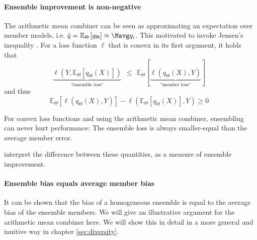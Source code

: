 \documentclass[
	twoside=false, %
]{kaobook}
\begin{document}
\paragraph{Ensemble improvement is non-negative} The arithmetic mean combiner can be seen as approximating an expectation over member models, i.e. $\bar{q} = \mathbb{E}_{\Theta} \left[q_{\Theta}\right] \approx \Mavg q_i$.
This motivated \cite{abe_PathologiesPredictiveDiversity_2023} to invoke Jensen's inequality
. For a loss function $\ell$ that is convex in its first argument, it holds that
$$
\underbrace{
\ell(Y, \mathbb{E}_{\Theta}\left[ q_{\Theta}(X)\right] ) 
}_{\text{"ensemble loss"}}
~ ~ \leq ~ ~ 
\mathbb{E}_{\Theta}\left[ 
\underbrace{
\ell(q_{\Theta}(X), Y)  
}_{\text{"member loss"}}
\right]
$$
and thus
$$
\mathbb{E}_{{\Theta}}\left[ \ell (q_{\Theta}(X),Y) \right]  -
\ell(\mathbb{E}_{\Theta}\left[ q_{\Theta}(X) \right] ,Y ) \geq 0
$$
\begin{corollary}
  For convex loss functions and using the arithmetic mean combiner, ensembling can never hurt performance: The ensemble loss is always smaller-equal than the average member error.
\end{corollary}
\citeauthor{abe_PathologiesPredictiveDiversity_2023} \cite{abe_PathologiesPredictiveDiversity_2023} interpret the difference between these quantities, as a measure of ensemble improvement. 

\paragraph{Ensemble bias equals average member bias}
It can be shown that the bias of a homogeneous ensemble is equal to the average bias of the ensemble members. We will give an illustrative argument for the arithmetic mean combiner here.
We will show this in detail in a more general and inuitive way in chapter \ref{sec:diversity}.
\end{document}
